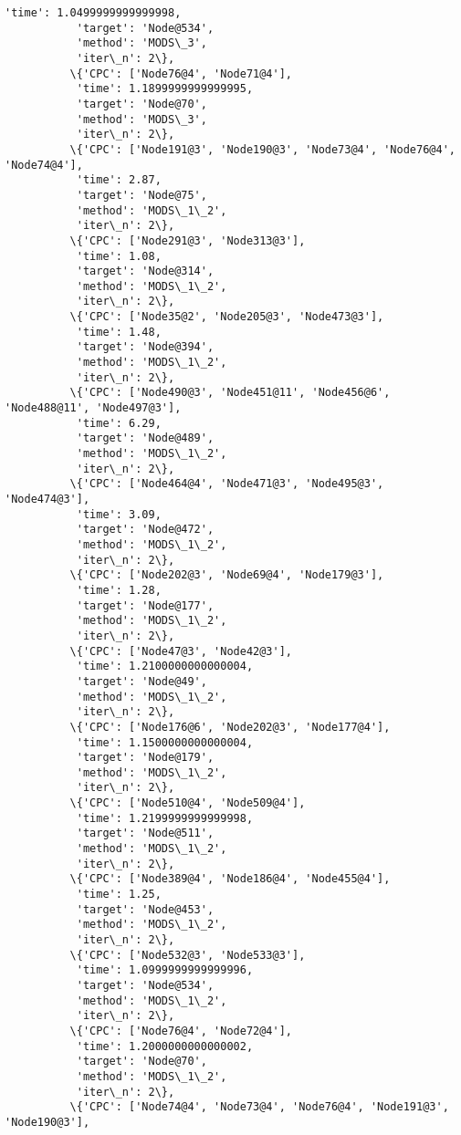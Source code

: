 \documentclass[11pt]{article}
\begin{document}
\begin{Verbatim}[commandchars=\\\{\}]
           'time': 1.0499999999999998,
           'target': 'Node@534',
           'method': 'MODS\_3',
           'iter\_n': 2\},
          \{'CPC': ['Node76@4', 'Node71@4'],
           'time': 1.1899999999999995,
           'target': 'Node@70',
           'method': 'MODS\_3',
           'iter\_n': 2\},
          \{'CPC': ['Node191@3', 'Node190@3', 'Node73@4', 'Node76@4', 'Node74@4'],
           'time': 2.87,
           'target': 'Node@75',
           'method': 'MODS\_1\_2',
           'iter\_n': 2\},
          \{'CPC': ['Node291@3', 'Node313@3'],
           'time': 1.08,
           'target': 'Node@314',
           'method': 'MODS\_1\_2',
           'iter\_n': 2\},
          \{'CPC': ['Node35@2', 'Node205@3', 'Node473@3'],
           'time': 1.48,
           'target': 'Node@394',
           'method': 'MODS\_1\_2',
           'iter\_n': 2\},
          \{'CPC': ['Node490@3', 'Node451@11', 'Node456@6', 'Node488@11', 'Node497@3'],
           'time': 6.29,
           'target': 'Node@489',
           'method': 'MODS\_1\_2',
           'iter\_n': 2\},
          \{'CPC': ['Node464@4', 'Node471@3', 'Node495@3', 'Node474@3'],
           'time': 3.09,
           'target': 'Node@472',
           'method': 'MODS\_1\_2',
           'iter\_n': 2\},
          \{'CPC': ['Node202@3', 'Node69@4', 'Node179@3'],
           'time': 1.28,
           'target': 'Node@177',
           'method': 'MODS\_1\_2',
           'iter\_n': 2\},
          \{'CPC': ['Node47@3', 'Node42@3'],
           'time': 1.2100000000000004,
           'target': 'Node@49',
           'method': 'MODS\_1\_2',
           'iter\_n': 2\},
          \{'CPC': ['Node176@6', 'Node202@3', 'Node177@4'],
           'time': 1.1500000000000004,
           'target': 'Node@179',
           'method': 'MODS\_1\_2',
           'iter\_n': 2\},
          \{'CPC': ['Node510@4', 'Node509@4'],
           'time': 1.2199999999999998,
           'target': 'Node@511',
           'method': 'MODS\_1\_2',
           'iter\_n': 2\},
          \{'CPC': ['Node389@4', 'Node186@4', 'Node455@4'],
           'time': 1.25,
           'target': 'Node@453',
           'method': 'MODS\_1\_2',
           'iter\_n': 2\},
          \{'CPC': ['Node532@3', 'Node533@3'],
           'time': 1.0999999999999996,
           'target': 'Node@534',
           'method': 'MODS\_1\_2',
           'iter\_n': 2\},
          \{'CPC': ['Node76@4', 'Node72@4'],
           'time': 1.2000000000000002,
           'target': 'Node@70',
           'method': 'MODS\_1\_2',
           'iter\_n': 2\},
          \{'CPC': ['Node74@4', 'Node73@4', 'Node76@4', 'Node191@3', 'Node190@3'],

\end{Verbatim}
\end{document}
